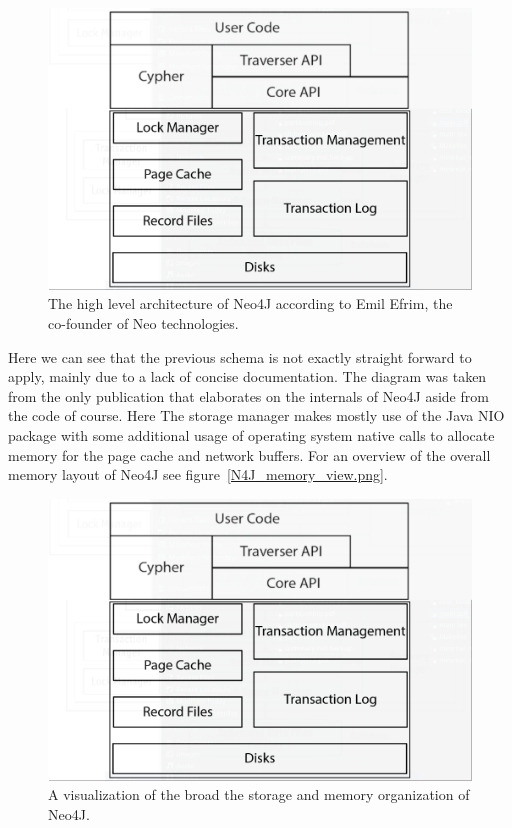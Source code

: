 \documentclass[a4paper,10pt]{article}
\begin{document}
\begin{figure}[htp]\label{N4J_HLA_Emil}
 \begin{center}
  \includegraphics[keepaspectratio,width=\textwidth]{img/N4J_HLA_Emil.png}
 \end{center}
 \caption{The high level architecture of Neo4J according to Emil Efrim, the co-founder of Neo technologies.} %
\end{figure}

Here we can see that the previous schema is not exactly straight forward to apply, mainly due to a lack of concise documentation. The diagram was taken from the only publication that elaborates on the internals of Neo4J aside from the code of course. Here The storage manager makes mostly use of the Java NIO package with some additional usage of operating system native calls to allocate memory for the page cache and network buffers. For an overview of the overall memory layout of Neo4J see figure~\ref{N4J_memory_view.png}.

\begin{figure}[htp]\label{N4J_HLA_Emil}
 \begin{center}
  \includegraphics[keepaspectratio,width=\textwidth]{img/N4J_HLA_Emil.png}
 \end{center}
 \caption{A visualization of the broad the storage and memory organization of Neo4J.} %
\end{figure}
\end{document}
